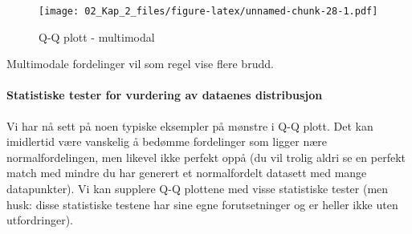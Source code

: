 \documentclass[
]{article}
\newenvironment{Shaded}{\begin{snugshade}}{\end{snugshade}}
\newcommand{\AttributeTok}[1]{\textcolor[rgb]{0.77,0.63,0.00}{#1}}
\newcommand{\CommentTok}[1]{\textcolor[rgb]{0.56,0.35,0.01}{\textit{#1}}}
\newcommand{\DecValTok}[1]{\textcolor[rgb]{0.00,0.00,0.81}{#1}}
\newcommand{\FunctionTok}[1]{\textcolor[rgb]{0.00,0.00,0.00}{#1}}
\newcommand{\NormalTok}[1]{#1}
\newcommand{\OtherTok}[1]{\textcolor[rgb]{0.56,0.35,0.01}{#1}}
\newcommand{\SpecialCharTok}[1]{\textcolor[rgb]{0.00,0.00,0.00}{#1}}
\newcommand{\StringTok}[1]{\textcolor[rgb]{0.31,0.60,0.02}{#1}}
\begin{document}
\begin{Shaded}
\end{Shaded}

\begin{figure}
\centering
\texttt{[image: 02\_Kap\_2\_files/figure-latex/unnamed-chunk-28-1.pdf]}
\caption{\label{fig:unnamed-chunk-28}Q-Q plott - multimodal}
\end{figure}

Multimodale fordelinger vil som regel vise flere brudd.

\hypertarget{statistiske-tester-for-vurdering-av-dataenes-distribusjon}{%
\paragraph{Statistiske tester for vurdering av dataenes distribusjon}\label{statistiske-tester-for-vurdering-av-dataenes-distribusjon}}

Vi har nå sett på noen typiske eksempler på mønstre i Q-Q plott. Det kan imidlertid være vanskelig å bedømme fordelinger som ligger nære normalfordelingen, men likevel ikke perfekt oppå (du vil trolig aldri se en perfekt match med mindre du har generert et normalfordelt datasett med mange datapunkter). Vi kan supplere Q-Q plottene med visse statistiske tester (men husk: disse statistiske testene har sine egne forutsetninger og er heller ikke uten utfordringer).
\end{document}

